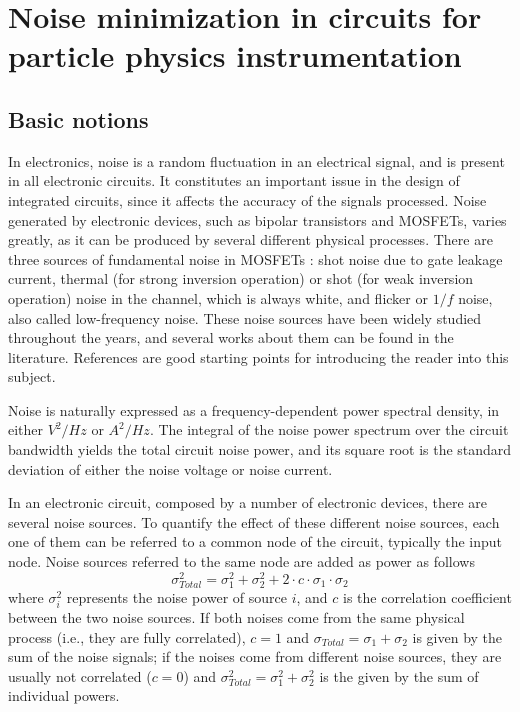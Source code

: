 \section{Noise minimization in circuits for particle physics instrumentation}
\subsection{Basic notions}
In electronics, noise is a random fluctuation in an electrical signal, and is present in all electronic circuits. It constitutes an important issue in the design of integrated circuits, since it affects the accuracy of the signals processed. Noise generated by electronic devices, such as bipolar transistors and MOSFETs, varies greatly, as it can be produced by several different physical processes. There are three sources of fundamental noise in MOSFETs \citep{gray101}: shot noise due to gate leakage current, thermal (for strong inversion operation) or shot (for weak inversion operation) noise in the channel, which is always white, and flicker or $1/f$ noise, also called low-frequency noise. These noise sources have been widely studied throughout the years, and several works about them can be found in the literature. References \citep{gray101,jindal101} are good starting points for introducing the reader into this subject.

Noise is naturally expressed as a frequency-dependent power spectral density, in either $V^2/\textit{Hz}$ or $A^2/\textit{Hz}$. The integral of the noise power spectrum over the circuit bandwidth yields the total circuit noise power, and its square root is the standard deviation of either the noise voltage or noise current.

In an electronic circuit, composed by a number of electronic devices, there are several noise sources. To quantify the effect of these different noise sources, each one of them can be referred to a common node of the circuit, typically the input node. Noise sources referred to the same node are added as power as follows 
\begin{equation}
\sigma^2_\textit{Total} = \sigma^2_1 + \sigma^2_2 + 2\cdot c \cdot \sigma_1 \cdot \sigma_2
\end{equation}
where $\sigma_i^2$ represents the noise power of source $i$, and $c$ is the correlation coefficient between the two noise sources. If both noises come from the same physical process (i.e., they are fully correlated), $c = 1$ and $\sigma_\textit{Total} = \sigma_1 + \sigma_2$ is given by the sum of the noise signals; if the noises come from different noise sources, they are usually not correlated ($c = 0$) and $\sigma^2_\textit{Total} = \sigma^2_1 + \sigma^2_2$ is the given by the sum of individual powers.

